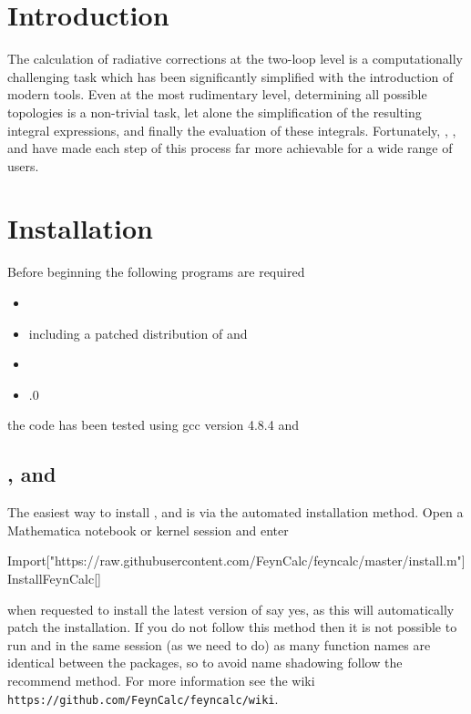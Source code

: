 \tableofcontents

\section{Introduction}

The calculation of radiative corrections at the two-loop level is a computationally challenging task which has been significantly simplified with the introduction of modern tools.  Even at the most rudimentary level, determining all possible topologies is a non-trivial task, let alone the simplification of the resulting integral expressions, and finally the evaluation of these integrals.  Fortunately, \feynarts \cite{Hahn2000}, \feyncalc \cite{Mertig1991,Shtabovenko2016}, \tarcer \cite{Mertig1998} and \tsil \cite{Martin2006} have made each step of this process far more achievable for a wide range of users.

\section{Installation}

Before beginning the following programs are required
\begin{itemize}
\item {}
\item {} including a patched distribution of  and 
\item {}
\item {}.0
\end{itemize}
the \mb \CC code has been tested using gcc version 4.8.4 and 

\subsection{\feyncalc, \feynarts and \tarcer}

The easiest way to install \feyncalc, \feynarts and \tarcer is via the automated installation method.  Open a Mathematica notebook or kernel session and enter
\begin{lstterm}
Import["https://raw.githubusercontent.com/FeynCalc/feyncalc/master/install.m"]
InstallFeynCalc[]
\end{lstterm}

when requested to install the latest version of \feynarts say yes, as this will automatically patch the \feynarts installation.  If you do not follow this method then it is not possible to run \feynarts and \feyncalc in the same session (as we need to do) as many function names are identical between the packages, so to avoid name shadowing follow the recommend method.  For more information see the \feyncalc wiki \lstinline{https://github.com/FeynCalc/feyncalc/wiki}.

